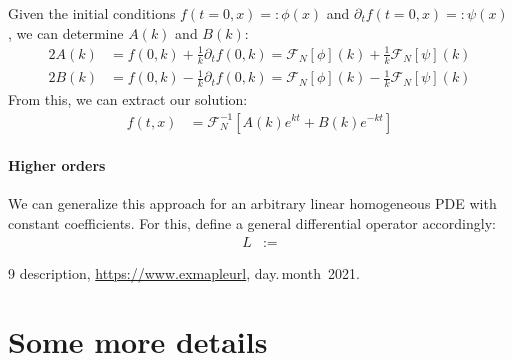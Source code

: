 \documentclass[english, parskip=full]{scrreprt}
\newcommand{\klam}{}
\begin{document}
Given the initial conditions $f(t=0,x)=:\phi(x)$ and $\partial_tf(t=0,x)=:\psi(x)$, we can determine $A(k)$ and $B(k)$:
\begin{align*}
2A(k)&=f(0,k)+\frac{1}{k}\partial_tf(0,k)=\mathcal{F}_N[\phi](k)+\frac{1}{k}\mathcal{F}_N[\psi](k)\\
2B(k)&=f(0,k)-\frac{1}{k}\partial_tf(0,k)=\mathcal{F}_N[\phi](k)-\frac{1}{k}\mathcal{F}_N[\psi](k)
\end{align*}
From this, we can extract our solution:
\begin{align*}
f(t,x)&=\mathcal{F}_N^{-1}\klam\left[ {A(k)e^{kt}+B(k)e^{-kt}} \right]
\end{align*}
\subsubsection{Higher orders}
We can generalize this approach for an arbitrary linear homogeneous PDE with constant coefficients. For this, define a general differential operator accordingly:
\begin{align*}
L&:=
\end{align*}

\begin{thebibliography}{9}
 description, \url{https://www.exmapleurl}, day.\,month~2021.
\end{thebibliography}

\appendix
\chapter{Some more details}
\end{document}
